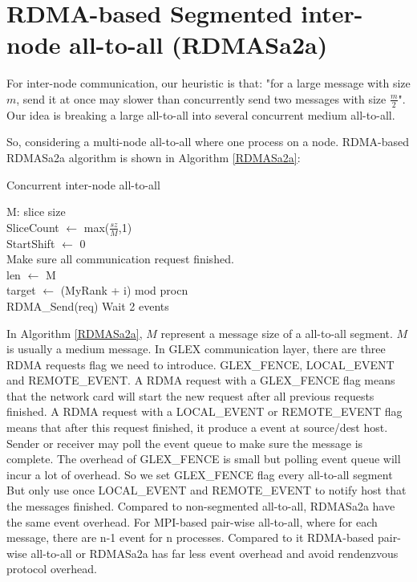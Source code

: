 \section {RDMA-based Segmented inter-node all-to-all (RDMASa2a)}

For inter-node communication, our heuristic is that: "for a large message with size $m$, send it at once may slower than concurrently send two messages with size $\frac{m}{2}$".
Our idea is breaking a large all-to-all into several concurrent medium all-to-all. 

So, considering a multi-node all-to-all where one process on a node. RDMA-based RDMASa2a algorithm is shown in Algorithm \ref{RDMASa2a}:
\begin{algorithm}
\caption{Concurrent inter-node all-to-all}\label{RDMASa2a}
M: slice size \\
{
	SliceCount $\leftarrow$ max($\frac{sz}{M}$,1) \\
	StartShift $\leftarrow$ 0 \\
	Make sure all communication request finished. \\
	{
		len $\leftarrow$ M \\
		{
			target $\leftarrow$ (MyRank + i) mod procn \\
			RDMA\_Send(req)
		}
	}
	Wait 2 events
}
\end{algorithm}
In Algorithm \ref{RDMASa2a}, $M$ represent a message size of a all-to-all segment. $M$ is usually a medium message.
In GLEX communication layer, there are three RDMA requests flag we need to introduce. GLEX\_FENCE, LOCAL\_EVENT and REMOTE\_EVENT.
A RDMA request with a GLEX\_FENCE flag means that the network card will start the new request after all previous requests finished.
A RDMA request with a LOCAL\_EVENT or REMOTE\_EVENT flag means that after this request finished, it produce a event at source/dest host.
Sender or receiver may poll the event queue to make sure the message is complete.
The overhead of GLEX\_FENCE is small but polling event queue will incur a lot of overhead.
So we set GLEX\_FENCE flag every all-to-all segment But only use once  LOCAL\_EVENT and REMOTE\_EVENT to notify host that the messages finished.
Compared to non-segmented all-to-all, RDMASa2a have the same event overhead.
For MPI-based pair-wise all-to-all, where for each message, there are n-1 event for n processes.
Compared to it RDMA-based pair-wise all-to-all or RDMASa2a has far less event overhead and avoid rendenzvous protocol overhead.
